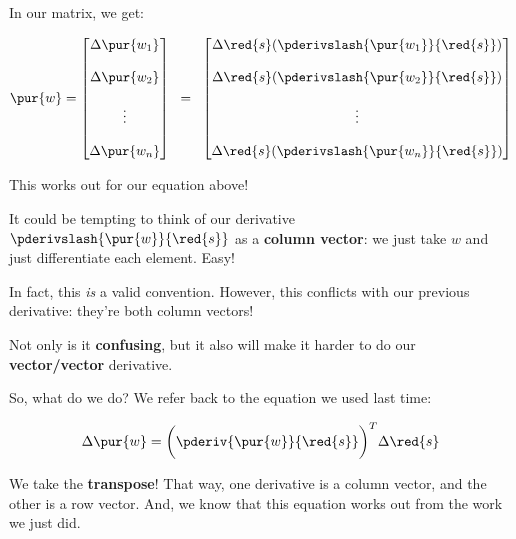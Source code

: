        In our matrix, we get:
        
        \begin{equation}
            \pur{w}
            =
            \begin{bmatrix}
                \Delta \pur{w_1}\\\\ \Delta \pur{w_2}\\\\ \vdots \\\\ \Delta \pur{w_n}
            \end{bmatrix}
            \;\;
            =
            \;\;
            \begin{bmatrix}
                \Delta \red{s} ( \pderivslash{ \pur{w_1} }{ \red{s} } )\\\\
                \Delta \red{s} ( \pderivslash{ \pur{w_2} }{ \red{s} } )\\\\
                \vdots \\\\
                \Delta \red{s} ( \pderivslash{ \pur{w_n} }{ \red{s} } )
            \end{bmatrix}
        \end{equation}
        
        This works out for our equation above!
        
        It could be tempting to think of our derivative $\pderivslash{ \pur{w} }{ \red{s} }$ as a \textbf{column vector}: we just take $w$ and just differentiate each element. Easy!
        
        In fact, this \textit{is} a valid convention. However, this conflicts with our previous derivative: they're both column vectors! 
        
        Not only is it \textbf{confusing}, but it also will make it harder to do our \textbf{vector/vector} derivative.
        
        So, what do we do? We refer back to the equation we used last time:
        
        \begin{equation}
            \Delta \pur{w}
            =
            \bigg(
                \pderiv{ \pur{w} }{ \red{s} } 
            \bigg)^T
            \Delta \red{s}
        \end{equation}
        
        We take the \textbf{transpose}! That way, one derivative is a column vector, and the other is a row vector. And, we know that this equation works out from the work we just did.
        
